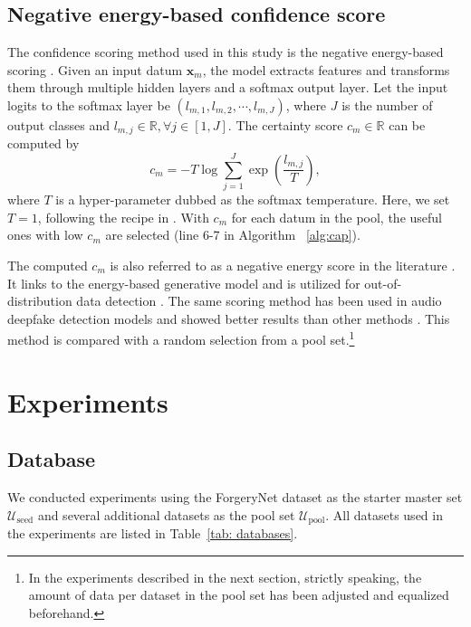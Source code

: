\documentclass[english]{lni}
\begin{document}
\subsection{Negative energy-based confidence score}
\label{sec:method-cm}

The confidence scoring method used in this study is the negative energy-based scoring \cite{NEURIPS2020_f5496252}. Given an input datum $\boldsymbol{x}_{m}$, the model extracts features and transforms them through multiple hidden layers and a softmax output layer. Let the input logits to the softmax layer be $(l_{m,1}, l_{m,2}, \cdots, l_{m,J})$, where $J$ is the number of output classes and $l_{m,j}\in\mathbb{R}, \forall j\in[1,J]$. The certainty score $c_m\in\mathbb{R}$ can be computed by
\begin{equation}
 c_m =  -T\log\sum_{j=1}^{J}\exp(\frac{l_{m,j}}{T}),
\end{equation}
where $T$ is a hyper-parameter dubbed as the softmax temperature. Here, we set $T=1$, following the recipe in \cite{NEURIPS2020_f5496252}. With $c_m$ for each datum in the pool, the useful ones with low $c_m$ are selected (line 6-7 in Algorithm ~\ref{alg:cap}). 


The computed $c_m$ is also referred to as a negative energy score in the literature \cite{NEURIPS2020_f5496252}. It links to the energy-based generative model and is utilized for out-of-distribution data detection \cite{NEURIPS2020_f5496252}. The same scoring method has been used in audio deepfake detection models and showed better results than other methods \cite{wangInvestigatingActivelearningbasedTraining2023}. This method is compared with a random selection from a pool set.\footnote{In the experiments described in the next section, strictly speaking, the amount of data per dataset in the pool set has been adjusted and equalized beforehand.}

\section{Experiments}

\subsection{Database}

We conducted experiments using the ForgeryNet dataset \cite{he2021forgerynet} as the starter master set $\mathcal{U}_{\text{seed}}$ and several additional datasets as the pool set $\mathcal{U}_{\text{pool}}$. All datasets used in the experiments are listed in Table~\ref{tab: databases}.
\end{document}
